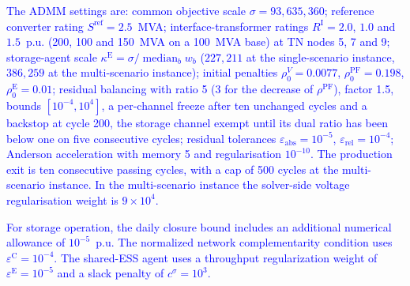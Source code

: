 \documentclass[preprint,12pt]{elsarticle}
\begin{document}
\textcolor{blue}{
    The ADMM settings are: common objective scale $\sigma = 93{,}635{,}360$; reference converter rating $S^{\text{ref}} = 2.5$~MVA; interface-transformer ratings $R^{\text{I}} = 2.0$, $1.0$ and $1.5$~p.u. (200, 100 and 150~MVA on a 100~MVA base) at TN nodes 5, 7 and 9; storage-agent scale $\kappa^{\text{E}} = \sigma/\operatorname{median}_b w_b$ ($227{,}211$ at the single-scenario instance, $386{,}259$ at the multi-scenario instance); initial penalties $\rho^{V}_0 = 0.0077$, $\rho^{\text{PF}}_0 = 0.198$, $\rho^{\text{E}}_0 = 0.01$; residual balancing with ratio 5 (3 for the decrease of $\rho^{\text{PF}}$), factor 1.5, bounds $[10^{-4}, 10^{4}]$, a per-channel freeze after ten unchanged cycles and a backstop at cycle 200, the storage channel exempt until its dual ratio has been below one on five consecutive cycles; residual tolerances $\varepsilon_{\text{abs}} = 10^{-5}$, $\varepsilon_{\text{rel}} = 10^{-4}$; Anderson acceleration with memory 5 and regularisation $10^{-10}$. The production exit is ten consecutive passing cycles, with a cap of 500 cycles at the multi-scenario instance. 
    In the multi-scenario instance the solver-side voltage regularisation weight is $9 \times 10^{4}$.
}

\textcolor{blue}{
    For storage operation, the daily closure bound includes an additional numerical allowance of $10^{-5}$~p.u.
    The normalized network complementarity condition uses $\varepsilon^{\text{C}} = 10^{-4}$. The shared-ESS agent uses a throughput regularization weight of $\varepsilon^{\text{E}} = 10^{-5}$ and a slack penalty of $c^{\sigma} = 10^{3}$.
}


\clearpage
\end{document}
